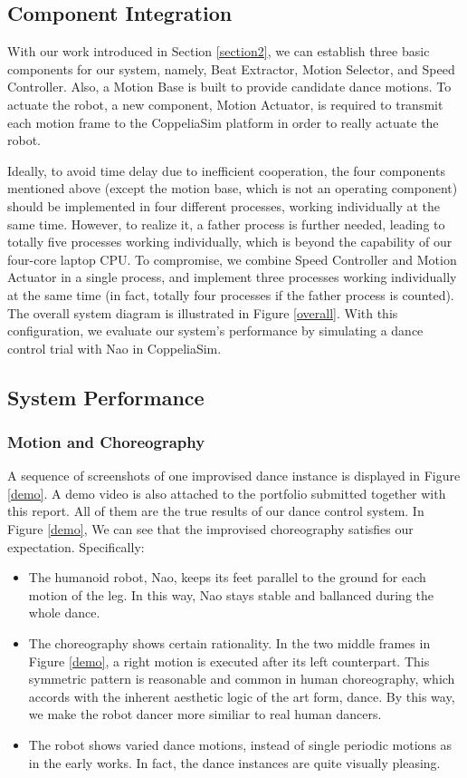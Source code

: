 \documentclass[UTF8,a4paper]{article}
\begin{document}
	\subsection{Component Integration}

	\noindent With our work introduced in Section \ref{section2}, we can establish three basic components for our system, namely, Beat Extractor, Motion Selector, and Speed Controller. Also, a Motion Base is built to provide candidate dance motions. To actuate the robot, a new component, Motion Actuator, is required to transmit each motion frame to the CoppeliaSim platform in order to really actuate the robot. 
	
	Ideally, to avoid time delay due to inefficient cooperation, the four components mentioned above (except the motion base, which is not an operating component) should be implemented in four different processes, working individually at the same time. However, to realize it, a father process is further needed, leading to totally five processes working individually, which is beyond the capability of our four-core laptop CPU. To compromise, we combine Speed Controller and Motion Actuator in a single process, and implement three processes working individually at the same time (in fact, totally four processes if the father process is counted). The overall system diagram is illustrated in Figure \ref{overall}. With this configuration, we evaluate our system's performance by simulating a dance control trial with Nao in CoppeliaSim.

	\subsection{System Performance}

	\subsubsection{Motion and Choreography}

	\noindent A sequence of screenshots of one improvised dance instance is displayed in Figure \ref{demo}. A demo video is also attached to the portfolio submitted together with this report. All of them are the true results of our dance control system. In Figure \ref{demo}, We can see that the improvised choreography satisfies our expectation. Specifically:
	\begin{itemize}
		\item The humanoid robot, Nao, keeps its feet parallel to the ground for each motion of the leg. In this way, Nao stays stable and ballanced during the whole dance.
		\item The choreography shows certain rationality. In the two middle frames in Figure \ref{demo}, a right motion is executed after its left counterpart. This symmetric pattern is reasonable and common in human choreography, which accords with the inherent aesthetic logic of the art form, dance. By this way, we make the robot dancer more similiar to real human dancers.
		\item The robot shows varied dance motions, instead of single periodic motions as in the early works. In fact, the dance instances are quite visually pleasing.
	\end{itemize}
\end{document}
